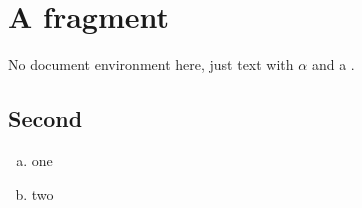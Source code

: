 \section{A fragment}
No document environment here, just text with $\alpha$ and a \cite{key1}.

\subsection{Second}
\begin{enumerate}[(a)]
  \item one
  \item two
\end{enumerate}
